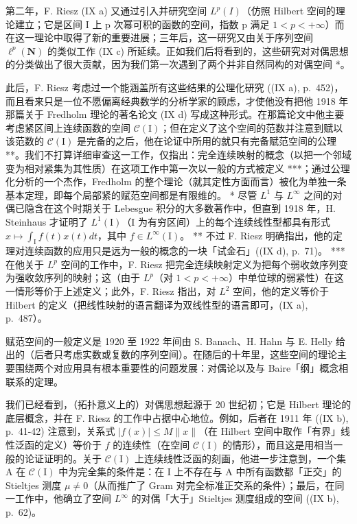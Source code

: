 第二年，F. Riesz (IX a) 又通过引入并研究空间 \(L^{p}(I)\)（仿照 Hilbert 空间的理论建立；它是区间 I 上 p 次幂可积的函数的空间，指数 p 满足 \(1 < p < +\infty\)）而在这一理论中取得了新的重要进展；三年后，这一研究又由关于序列空间 \(\ell^{p}(\mathbf{N})\) 的类似工作 (IX c) 所延续。正如我们后将看到的，这些研究对对偶思想的分类做出了很大贡献，因为我们第一次遇到了两个并非自然同构的对偶空间 *。

此后，F. Riesz 考虑过一个能涵盖所有这些结果的公理化研究 ((IX a), p.~452)，而且看来只是一位不愿偏离经典数学的分析学家的顾虑，才使他没有把他 1918 年那篇关于 Fredholm 理论的著名论文 (IX d) 写成这种形式。在那篇论文中他主要考虑紧区间上连续函数的空间 \(\mathcal{C}(\mathrm{I})\)；但在定义了这个空间的范数并注意到赋以该范数的 \(\mathcal{C}(\mathrm{I})\) 是完备的之后，他在论证中所用的就只有完备赋范空间的公理 **。我们不打算详细审查这一工作，仅指出：完全连续映射的概念（以把一个邻域变为相对紧集为其性质）在这项工作中第一次以一般的方式被定义 ***；通过公理化分析的一个杰作，Fredholm 的整个理论（就其定性方面而言）被化为单独一条基本定理，即每个局部紧的赋范空间都是有限维的。
* 尽管 \(L^1\) 与 \(L^\infty\) 之间的对偶已隐含在这个时期关于 Lebesgue 积分的大多数著作中，但直到 1918 年，H. Steinhaus 才证明了 \(L^1(\mathrm{I})\)（I 为有穷区间）上的每个连续线性型都具有形式 \(x\mapsto\int_{\mathrm{I}} f(t)x(t)dt\)，其中 \(f\in L^\infty(\mathrm{I})\)。
** 不过 F. Riesz 明确指出，他的定理对连续函数的应用只是远为一般的概念的一块「试金石」((IX d), p.~71)。
*** 在他关于 \(L^p\) 空间的工作中，F. Riesz 把完全连续映射定义为把每个弱收敛序列变为强收敛序列的映射；这（由于 \(L^p\)（对 \(1 < p < +\infty\)）中单位球的弱紧性）在这一情形等价于上述定义；此外，F. Riesz 指出，对 \(L^2\) 空间，他的定义等价于 Hilbert 的定义（把线性映射的语言翻译为双线性型的语言即可，(IX a), p.~487）。

赋范空间的一般定义是 1920 至 1922 年间由 S. Banach、H. Hahn 与 E. Helly 给出的（后者只考虑实数或复数的序列空间）。在随后的十年里，这些空间的理论主要围绕两个对应用具有根本重要性的问题发展：对偶论以及与 Baire「纲」概念相联系的定理。

我们已经看到，（拓扑意义上的）对偶思想起源于 20 世纪初；它是 Hilbert 理论的底层概念，并在 F. Riesz 的工作中占据中心地位。例如，后者在 1911 年 ((IX b), p.~41-42) 注意到，关系式 \(|f(x)| \leqslant M \| x\|\)（在 Hilbert 空间中取作「有界」线性泛函的定义）等价于 \(f\) 的连续性（在空间 \(\mathcal{C}(\mathrm{I})\) 的情形），而且这是用相当一般的论证证明的。关于 \(\mathcal{C}(\mathrm{I})\) 上连续线性泛函的刻画，他进一步注意到，一个集 A 在 \(\mathcal{C}(\mathrm{I})\) 中为完全集的条件是：在 I 上不存在与 A 中所有函数都「正交」的 Stieltjes 测度 \(\mu \neq 0\)（从而推广了 Gram 对完全标准正交系的条件）；最后，在同一工作中，他确立了空间 \(L^{\infty}\) 的对偶「大于」Stieltjes 测度组成的空间 ((IX b), p.~62)。

